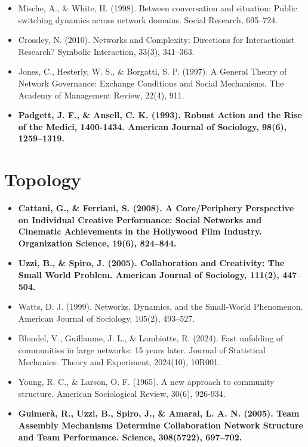 \documentclass[
]{book}
\begin{document}
\begin{itemize}
\item
  Mische, A., \& White, H. (1998). Between conversation and situation: Public switching dynamics across network domains. Social Research, 695--724.
\item
  Crossley, N. (2010). Networks and Complexity: Directions for Interactionist Research? Symbolic Interaction, 33(3), 341--363.
\item
  Jones, C., Hesterly, W. S., \& Borgatti, S. P. (1997). A General Theory of Network Governance: Exchange Conditions and Social Mechanisms. The Academy of Management Review, 22(4), 911.
\item
  \textbf{Padgett, J. F., \& Ansell, C. K. (1993). Robust Action and the Rise of the Medici, 1400-1434. American Journal of Sociology, 98(6), 1259--1319.}
\end{itemize}

\section*{\texorpdfstring{\textbf{Topology}}{Topology}}\label{topology}

\begin{itemize}
\item
  \textbf{Cattani, G., \& Ferriani, S. (2008). A Core/Periphery Perspective on Individual Creative Performance: Social Networks and Cinematic Achievements in the Hollywood Film Industry. Organization Science, 19(6), 824--844.}
\item
  \textbf{Uzzi, B., \& Spiro, J. (2005). Collaboration and Creativity: The Small World Problem. American Journal of Sociology, 111(2), 447--504.}
\item
  Watts, D. J. (1999). Networks, Dynamics, and the Small‐World Phenomenon. American Journal of Sociology, 105(2), 493--527.
\item
  Blondel, V., Guillaume, J. L., \& Lambiotte, R. (2024). Fast unfolding of communities in large networks: 15 years later. Journal of Statistical Mechanics: Theory and Experiment, 2024(10), 10R001.
\item
  Young, R. C., \& Larson, O. F. (1965). A new approach to community structure. American Sociological Review, 30(6), 926-934.
\item
  \textbf{Guimerà, R., Uzzi, B., Spiro, J., \& Amaral, L. A. N. (2005). Team Assembly Mechanisms Determine Collaboration Network Structure and Team Performance. Science, 308(5722), 697--702.}
\end{itemize}
\end{document}

